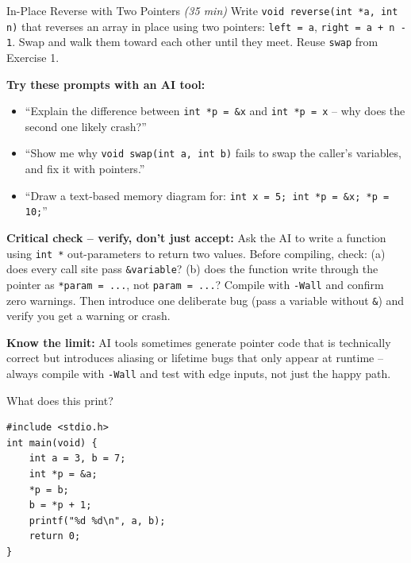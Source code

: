 \documentclass[11pt]{article}
\begin{document}
\begin{labexercise}{In-Place Reverse with Two Pointers \hfill {\small \itshape (35 min)}}
Write \texttt{void reverse(int *a, int n)} that reverses an array in place using two
pointers: \texttt{left = a}, \texttt{right = a + n - 1}. Swap and walk them toward
each other until they meet. Reuse \texttt{swap} from Exercise 1.
\end{labexercise}

\begin{aicollab}
\textbf{Try these prompts with an AI tool:}
\begin{itemize}[leftmargin=*,nosep]
  \item ``Explain the difference between \texttt{int *p = \&x} and \texttt{int *p = x}
        -- why does the second one likely crash?''
  \item ``Show me why \texttt{void swap(int a, int b)} fails to swap the caller's
        variables, and fix it with pointers.''
  \item ``Draw a text-based memory diagram for: \texttt{int x = 5; int *p = \&x; *p = 10;}''
\end{itemize}

\medskip\textbf{Critical check -- verify, don't just accept:}
Ask the AI to write a function using \texttt{int *} out-parameters to return two values.
Before compiling, check: (a) does every call site pass \texttt{\&variable}?
(b) does the function write through the pointer as \texttt{*param = ...}, not
\texttt{param = ...}?
Compile with \texttt{-Wall} and confirm zero warnings. Then introduce one deliberate bug
(pass a variable without \texttt{\&}) and verify you get a warning or crash.

\medskip\textbf{Know the limit:}
AI tools sometimes generate pointer code that is technically correct but introduces
aliasing or lifetime bugs that only appear at runtime -- always compile with \texttt{-Wall}
and test with edge inputs, not just the happy path.
\end{aicollab}

\takehomebanner

\begin{trace}
What does this print?
\begin{lstlisting}
#include <stdio.h>
int main(void) {
    int a = 3, b = 7;
    int *p = &a;
    *p = b;
    b = *p + 1;
    printf("%d %d\n", a, b);
    return 0;
}
\end{lstlisting}
\end{trace}
\end{document}
